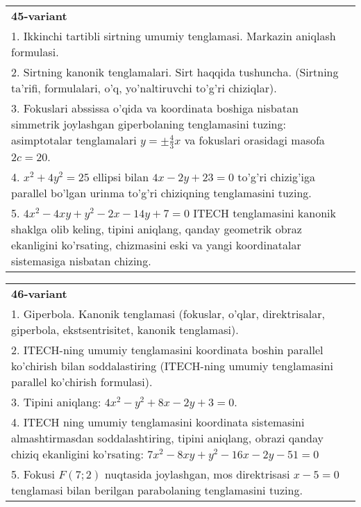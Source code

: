 \documentclass{article}
\begin{document}
\begin{tabular}{m{17cm}}
\textbf{45-variant}\\
1. Ikkinchi tartibli sirtning umumiy tenglamasi. Markazin aniqlash formulasi.\\

2. Sirtning kanonik tenglamalari. Sirt haqqida tushuncha. (Sirtning ta'rifi, formulalari, o'q, yo'naltiruvchi to'g'ri chiziqlar).\\

3. Fokuslari abssissa o'qida va koordinata boshiga nisbatan simmetrik joylashgan giperbolaning tenglamasini tuzing: asimptotalar tenglamalari $y=\pm \frac{4}{3}x$ va fokuslari orasidagi masofa $2c=20$.\\

4. $x^{2} + 4y^{2} = 25$ ellipsi bilan $4x - 2y + 23 = 0$ to'g'ri chizig'iga parallel bo'lgan urinma to'g'ri chiziqning tenglamasini tuzing.  \\

5. $4x^{2} - 4xy + y^{2} - 2x - 14y + 7 = 0$ ITECH tenglamasini kanonik shaklga olib keling, tipini aniqlang, qanday geometrik obraz ekanligini ko'rsating, chizmasini eski va yangi koordinatalar sistemasiga nisbatan chizing.  
\end{tabular}
\vspace{1cm}


\begin{tabular}{m{17cm}}
\textbf{46-variant}\\
1. Giperbola. Kanonik tenglamasi (fokuslar, o'qlar, direktrisalar, giperbola, ekstsentrisitet, kanonik tenglamasi).\\

2. ITECH-ning umumiy tenglamasini koordinata boshin parallel ko'chirish bilan soddalastiring (ITECH-ning umumiy tenglamasini parallel ko'chirish formulasi).\\

3. Tipini aniqlang: $4x^{2}-y^{2}+8x-2y+3=0$.\\

4. ITECH ning umumiy tenglamasini koordinata sistemasini almashtirmasdan soddalashtiring, tipini aniqlang, obrazi qanday chiziq ekanligini ko'rsating: $7x^{2} - 8xy + y^{2} - 16x - 2y - 51 = 0$\\

5. Fokusi $F(7;2)$ nuqtasida joylashgan, mos direktrisasi $x - 5 = 0$ tenglamasi bilan berilgan parabolaning tenglamasini tuzing.  
\end{tabular}
\vspace{1cm}
\end{document}
